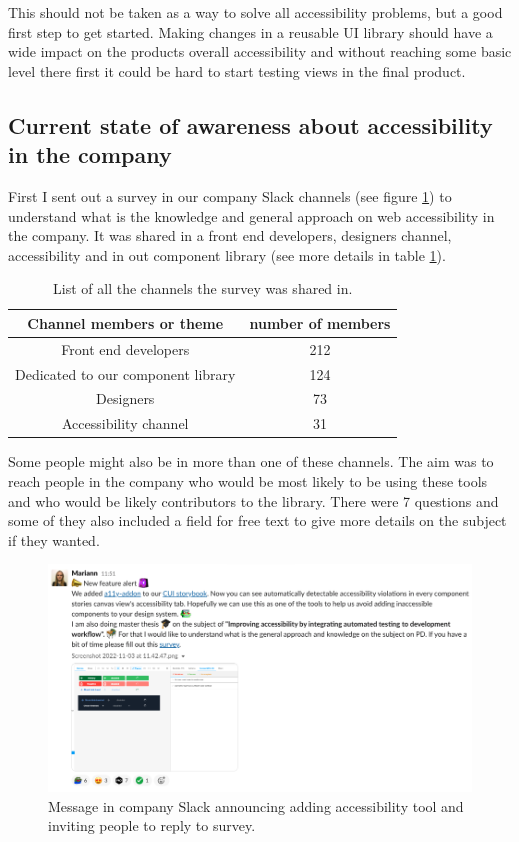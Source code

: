 \documentclass{master_thesis}
\begin{document}
This should not be taken as a way to solve all accessibility problems, but a good first step to get started. Making changes in a reusable UI library should have a wide impact on the products overall accessibility and without reaching some basic level there first it could be hard to start testing views in the final product.

\subsection{Current state of awareness about accessibility in the company}

First I sent out a survey in our company Slack channels (see figure \ref{fig:slack-message}) to understand what is the knowledge and general approach on web accessibility in the company. It was shared in a front end developers, designers channel, accessibility and in out component library (see more details in table \ref{table:survey-shared}).

\begin{table}[h]
	\centering
	\begin{tabular}{|c|c|}
		\hline
		\textbf{Channel members or theme} & \textbf{number of members}  \\
		\hline
		Front end developers  & 212  \\
		\hline
		Dedicated to our component library  & 124  \\
		\hline
		Designers  & 73  \\
		\hline
		Accessibility channel  & 31  \\
		\hline
	\end{tabular}
	\caption{List of all the channels the survey was shared in.}
	\label{table:survey-shared}
\end{table}

Some people might also be in more than one of these channels. The aim was to reach people in the company who would be most likely to be using these tools and who would be likely contributors to the library. There were 7 questions and some of they also included a field for free text to give more details on the subject if they wanted.

\begin{figure}[h]
	\includegraphics[width=\textwidth]{img/survey.png}
	\caption{Message in company Slack announcing adding accessibility tool and inviting people to reply to survey.}
	\label{fig:slack-message}
\end{figure}
\end{document}
